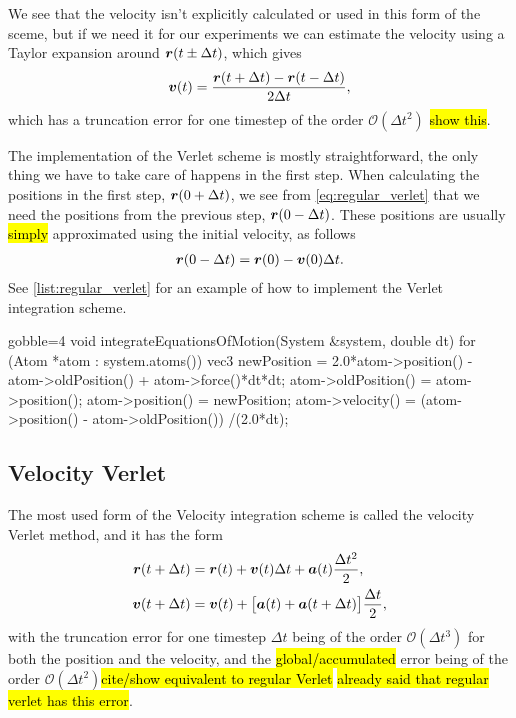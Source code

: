 We see that the velocity isn't explicitly calculated or used in this form of the sceme, but if we need it for our experiments we can estimate the velocity using a Taylor expansion around $\boldsymbol{r}(t\pm\Delta t)$, which gives
\begin{align*}
    \boldsymbol{v}(t) = \frac{\boldsymbol{r}(t + \Delta t) - \boldsymbol{r}(t - \Delta t)}{2\Delta t},
\end{align*}
which has a truncation error for one timestep of the order $\mathcal{O}(\Delta t^2)$ \hl{show this}. 

The implementation of the Verlet scheme is mostly straightforward, the only thing we have to take care of happens in the first step. When calculating the positions in the first step, $\boldsymbol{r}(0+\Delta t)$, we see from \cref{eq:regular_verlet} that we need the positions from the previous step, $\boldsymbol{r}(0-\Delta t)$. These positions are usually \hl{simply} approximated using the initial velocity, as follows
\begin{align*}
    \boldsymbol{r}(0-\Delta t) = \boldsymbol{r}(0) - \boldsymbol{v}(0)\Delta t.
\end{align*}
See \cref{list:regular_verlet} for an example of how to implement the Verlet integration scheme.
%
\begin{listing}[!htb]%
\begin{cppcode*}{gobble=4}
    void integrateEquationsOfMotion(System &system, double dt) {
        for (Atom *atom : system.atoms()) {
            vec3 newPosition = 2.0*atom->position() - atom->oldPosition() 
                               + atom->force()*dt*dt;
            atom->oldPosition() = atom->position();
            atom->position() = newPosition;
            atom->velocity() = (atom->position() - atom->oldPosition())
                               /(2.0*dt);
        }
    }
\end{cppcode*}
\caption{%
    Implentation of  from \cref{list:simple_md_program}.%
    \label{list:regular_verlet}%
}%
\end{listing}%

\subsection{Velocity Verlet}
The most used form of the Velocity integration scheme is called the velocity Verlet method\cite{swope1982computer}, and it has the form
\begin{align}
    \boldsymbol{r}(t + \Delta t) &= \boldsymbol{r}(t) + \boldsymbol{v}(t)\Delta t + \boldsymbol{a}(t)\frac{\Delta t^2}{2}, \label{eq:velocity_verlet_position}\\
    \boldsymbol{v}(t + \Delta t) &= \boldsymbol{v}(t) + \big[\boldsymbol{a}(t) + \boldsymbol{a}(t + \Delta t)\big] \frac{\Delta t}{2}, \label{eq:velocity_verlet_velocity}
\end{align}
with the truncation error for one timestep $\Delta t$ being of the order $\mathcal{O}(\Delta t^3)$ for both the position and the velocity, and the \hl{global/accumulated} error being of the order $\mathcal{O}(\Delta t^2)$\hl{cite/show equivalent to regular Verlet} \hl{already said that regular verlet has this error}. 

